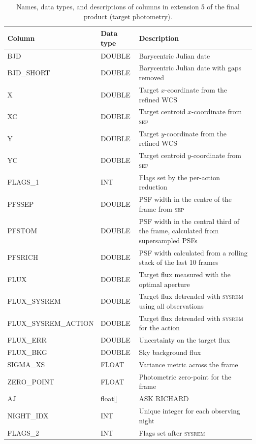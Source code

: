 \documentclass[fleqn,usenatbib]{mnras}
\begin{document}
\begin{table}
    \centering
    \caption{Names, data types, and descriptions of columns in extension 5 of the final product (target photometry).}
    \label{tab:final_product_cols_tab5}
    \begin{tabularx}{\textwidth}{@{}ll>{\raggedright\arraybackslash}X@{}}
    \toprule
    Column & Data type & Description \\
    \midrule
    BJD & DOUBLE & Barycentric Julian date \\
    BJD\_SHORT & DOUBLE & Barycentric Julian date with gaps removed \\
    X & DOUBLE & Target $x$-coordinate from the refined WCS \\
    XC & DOUBLE & Target centroid $x$-coordinate from \textsc{sep} \\
    Y & DOUBLE & Target $y$-coordinate from the refined WCS \\
    YC & DOUBLE & Target centroid $y$-coordinate from \textsc{sep} \\
    FLAGS\_1 & INT & Flags set by the per-action reduction \\
    PFSSEP & DOUBLE & PSF width in the centre of the frame from \textsc{sep} \\
    PFSTOM & DOUBLE & PSF width in the central third of the frame, calculated from supersampled PSFs \\
    PFSRICH & DOUBLE & PSF width calculated from a rolling stack of the last 10 frames \\
    FLUX & DOUBLE & Target flux measured with the optimal aperture \\
    FLUX\_SYSREM & DOUBLE & Target flux detrended with \textsc{sysrem} using all observations \\
    FLUX\_SYSREM\_ACTION & DOUBLE & Target flux detrended with \textsc{sysrem} for the action \\
    FLUX\_ERR & DOUBLE & Uncertainty on the target flux \\
    FLUX\_BKG & DOUBLE & Sky background flux \\
    SIGMA\_XS & FLOAT & Variance metric across the frame \\
    ZERO\_POINT & FLOAT & Photometric zero-point for the frame \\
    AJ & float[] & ASK RICHARD \\
    NIGHT\_IDX & INT & Unique integer for each observing night \\
    FLAGS\_2 & INT & Flags set after \textsc{sysrem} \\

\end{tabularx}
\end{table}
\end{document}
